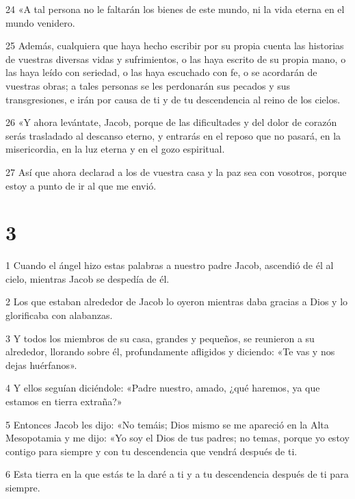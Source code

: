 \par 24 «A tal persona no le faltarán los bienes de este mundo, ni la vida eterna en el mundo venidero.

\par 25 Además, cualquiera que haya hecho escribir por su propia cuenta las historias de vuestras diversas vidas y sufrimientos, o las haya escrito de su propia mano, o las haya leído con seriedad, o las haya escuchado con fe, o se acordarán de vuestras obras; a tales personas se les perdonarán sus pecados y sus transgresiones, e irán por causa de ti y de tu descendencia al reino de los cielos.

\par 26 «Y ahora levántate, Jacob, porque de las dificultades y del dolor de corazón serás trasladado al descanso eterno, y entrarás en el reposo que no pasará, en la misericordia, en la luz eterna y en el gozo espiritual.

\par 27 Así que ahora declarad a los de vuestra casa y la paz sea con vosotros, porque estoy a punto de ir al que me envió.

\chapter{3}

\par 1 Cuando el ángel hizo estas palabras a nuestro padre Jacob, ascendió de él al cielo, mientras Jacob se despedía de él.

\par 2 Los que estaban alrededor de Jacob lo oyeron mientras daba gracias a Dios y lo glorificaba con alabanzas.

\par 3 Y todos los miembros de su casa, grandes y pequeños, se reunieron a su alrededor, llorando sobre él, profundamente afligidos y diciendo: «Te vas y nos dejas huérfanos».

\par 4 Y ellos seguían diciéndole: «Padre nuestro, amado, ¿qué haremos, ya que estamos en tierra extraña?»

\par 5 Entonces Jacob les dijo: «No temáis; Dios mismo se me apareció en la Alta Mesopotamia y me dijo: «Yo soy el Dios de tus padres; no temas, porque yo estoy contigo para siempre y con tu descendencia que vendrá después de ti.

\par 6 Esta tierra en la que estás te la daré a ti y a tu descendencia después de ti para siempre.

